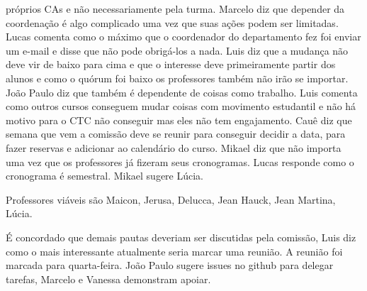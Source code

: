 \documentclass{ata-calico}
\begin{document}
próprios CAs e não necessariamente pela turma. Marcelo diz que depender da
coordenação é algo complicado uma vez que suas ações podem ser limitadas. Lucas
comenta como o máximo que o coordenador do departamento fez foi enviar um
e-mail e disse que não pode obrigá-los a nada. Luis diz que a mudança não deve
vir de baixo para cima e que o interesse deve primeiramente partir dos alunos e
como o quórum foi baixo os professores também não irão se importar. João Paulo
diz que também é dependente de coisas como trabalho. Luis comenta como outros
cursos conseguem mudar coisas com movimento estudantil e não há motivo para o
CTC não conseguir mas eles não tem engajamento. Cauê diz que semana que vem a
comissão deve se reunir para conseguir decidir a data, para fazer reservas e
adicionar ao calendário do curso. Mikael diz que não importa uma vez que os
professores já fizeram seus cronogramas. Lucas responde como o cronograma é
semestral. Mikael sugere Lúcia.

Professores viáveis são Maicon, Jerusa, Delucca, Jean Hauck, Jean Martina,
Lúcia.


É concordado que demais pautas deveriam ser discutidas pela comissão, Luis diz
como o mais interessante atualmente seria marcar uma reunião. A reunião foi
marcada para quarta-feira. João Paulo sugere issues no github para delegar
tarefas, Marcelo e Vanessa demonstram apoiar.

\end{document}
